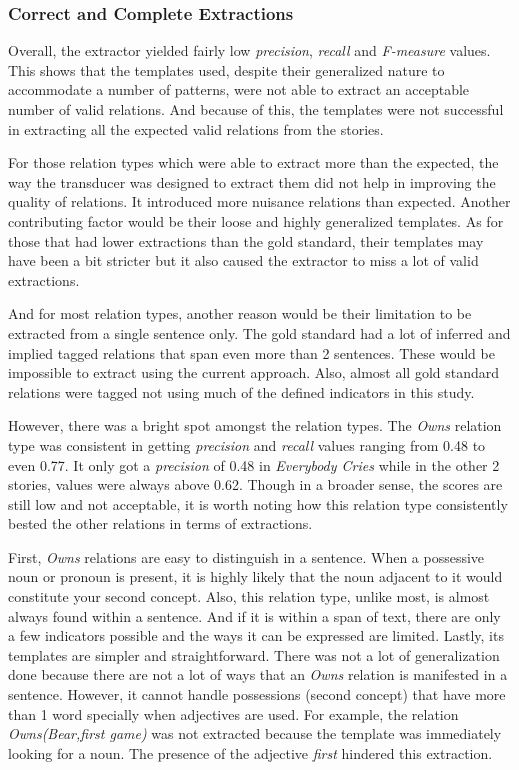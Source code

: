 \subsubsection*{Correct and Complete Extractions}

Overall, the extractor yielded fairly low \textit{precision}, \textit{recall} and \textit{F-measure} values. This shows that the templates used, despite their generalized nature to accommodate a number of patterns, were not able to extract an acceptable number of valid relations. And because of this, the templates were not successful in extracting all the expected valid relations from the stories. 

For those relation types which were able to extract more than the expected, the way the transducer was designed to extract them did not help in improving the quality of relations. It introduced more nuisance relations than expected. Another contributing factor would be their loose and highly generalized templates. As for those that had lower extractions than the gold standard, their templates may have been a bit stricter but it also caused the extractor to miss a lot of valid extractions. 

And for most relation types, another reason would be their limitation to be extracted from a single sentence only. The gold standard had a lot of inferred and implied tagged relations that span even more than 2 sentences. These would be impossible to extract using the current approach. Also, almost all gold standard relations were tagged not using much of the defined indicators in this study.

However, there was a bright spot amongst the relation types. The \textit{Owns} relation type was consistent in getting \textit{precision} and \textit{recall} values ranging from 0.48 to even 0.77. It only got a \textit{precision} of 0.48 in \textit{Everybody Cries} while in the other 2 stories, values were always above 0.62. Though in a broader sense, the scores are still low and not acceptable, it is worth noting how this relation type consistently bested the other relations in terms of extractions. 

First, \textit{Owns} relations are easy to distinguish in a sentence. When a possessive noun or pronoun is present, it is highly likely that the noun adjacent to it would constitute your second concept. Also, this relation type, unlike most, is almost always found within a sentence. And if it is within a span of text, there are only a few indicators possible and the ways it can be expressed are limited. Lastly, its templates are simpler and straightforward. There was not a lot of generalization done because there are not a lot of ways that an \textit{Owns} relation is manifested in a sentence. However, it cannot handle possessions (second concept) that have more than 1 word specially when adjectives are used. For example, the relation \textit{Owns(Bear,first game)} was not extracted because the template was immediately looking for a noun. The presence of the adjective \textit{first} hindered this extraction.  

